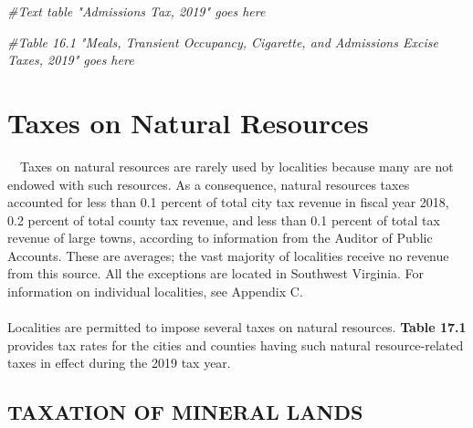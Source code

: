 \documentclass[
]{book}
\newenvironment{Shaded}{\begin{snugshade}}{\end{snugshade}}
\newcommand{\CommentTok}[1]{\textcolor[rgb]{0.56,0.35,0.01}{\textit{#1}}}
\begin{document}
\begin{Shaded}
\begin{Highlighting}[]
\CommentTok{\#Text table "Admissions Tax, 2019" goes here}

\CommentTok{\#Table 16.1 "Meals, Transient Occupancy, Cigarette, and Admissions Excise Taxes, 2019" goes here}
\end{Highlighting}
\end{Shaded}

\hypertarget{taxes-on-natural-resources}{%
\chapter{Taxes on Natural Resources}\label{taxes-on-natural-resources}}

~~Taxes on natural resources are rarely used by localities because many are not endowed with such resources. As a consequence, natural resources taxes accounted for less than 0.1 percent of total city tax revenue in fiscal year 2018, 0.2 percent of total county tax revenue, and less than 0.1 percent of total tax revenue of large towns, according to information from the Auditor of Public Accounts. These are averages; the vast majority of localities receive no revenue from this source. All the exceptions are located in Southwest Virginia. For information on individual localities, see Appendix C.\\
~\\
\hspace*{0.333em}\hspace*{0.333em}Localities are permitted to impose several taxes on natural resources. \textbf{Table 17.1} provides tax rates for the cities and counties having such natural resource-related taxes in effect during the 2019 tax year.\\

\hypertarget{taxation-of-mineral-lands}{%
\section{TAXATION OF MINERAL LANDS}\label{taxation-of-mineral-lands}}
\end{document}
